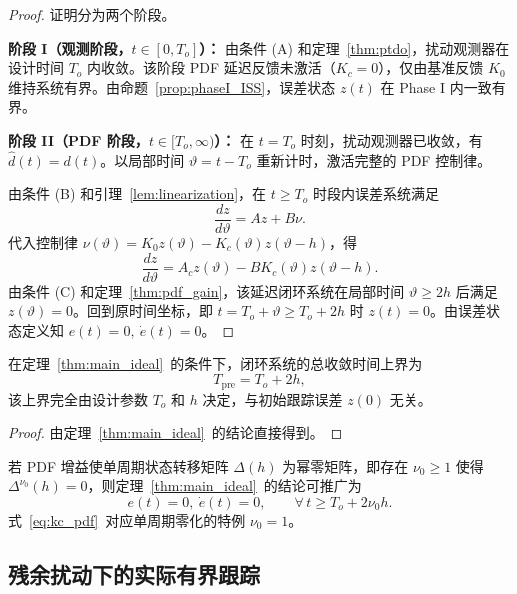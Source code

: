 \begin{proof}
  证明分为两个阶段。

  \textbf{阶段 I（观测阶段，\(t\in[0,T_o]\)）：} 由条件 (A) 和定理~\ref{thm:ptdo}，扰动观测器在设计时间 \(T_o\) 内收敛。该阶段 PDF 延迟反馈未激活（\(K_c=0\)），仅由基准反馈 \(K_0\) 维持系统有界。由命题~\ref{prop:phaseI_ISS}，误差状态 \(z(t)\) 在 Phase I 内一致有界。

  \textbf{阶段 II（PDF 阶段，\(t\in[T_o,\infty)\)）：} 在 \(t=T_o\) 时刻，扰动观测器已收敛，有 \(\hat d(t)=d(t)\)。以局部时间 \(\vartheta=t-T_o\) 重新计时，激活完整的 PDF 控制律。
  
  由条件 (B) 和引理~\ref{lem:linearization}，在 \(t\ge T_o\) 时段内误差系统满足
  \[
  \frac{dz}{d\vartheta} = A z + B\nu.
  \]
  代入控制律 \(\nu(\vartheta) = K_0 z(\vartheta) - K_c(\vartheta)z(\vartheta-h)\)，得
  \[
  \frac{dz}{d\vartheta} = A_c z(\vartheta) - BK_c(\vartheta)z(\vartheta-h).
  \]
  由条件 (C) 和定理~\ref{thm:pdf_gain}，该延迟闭环系统在局部时间 \(\vartheta\ge 2h\) 后满足 \(z(\vartheta)=0\)。回到原时间坐标，即 \(t = T_o + \vartheta \ge T_o + 2h\) 时 \(z(t)=0\)。由误差状态定义知 \(e(t)=0,\ \dot e(t)=0\)。
\end{proof}

\begin{corollary}[预设时间上界]\label{cor:prescribed_time}
  在定理~\ref{thm:main_ideal}~的条件下，闭环系统的总收敛时间上界为
  \begin{equation}
  T_{\mathrm{pre}} = T_o + 2h,
  \label{eq:prescribed_time_bound}
  \end{equation}
  该上界完全由设计参数 \(T_o\) 和 \(h\) 决定，与初始跟踪误差 \(z(0)\) 无关。
\end{corollary}

\begin{proof}
  由定理~\ref{thm:main_ideal}~的结论直接得到。
\end{proof}

\begin{remark}[与幂零情形的推广]
  若 PDF 增益使单周期状态转移矩阵 \(\Delta(h)\) 为幂零矩阵，即存在 \(\nu_0\ge 1\) 使得 \(\Delta^{\nu_0}(h)=0\)，则定理~\ref{thm:main_ideal}~的结论可推广为
  \[
  e(t)=0,\ \dot e(t)=0,\qquad \forall\,t\ge T_o+2\nu_0 h.
  \]
  式~\eqref{eq:kc_pdf}~对应单周期零化的特例 \(\nu_0=1\)。
\end{remark}

\subsection{残余扰动下的实际有界跟踪}
\label{sec:practical}

